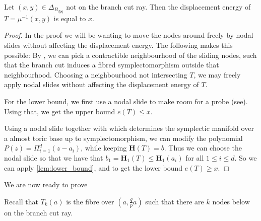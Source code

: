 \documentclass[12pt,a4paper,draft]{scrartcl}
\begin{document}

\begin{lemma}
  \label{lem:bdq_displacement}
  Let $(x,y) ∈ Δ_{B_{dpq}}$ not on the branch cut ray. Then the displacement energy of $T = μ^{-1}(x,y)$ is equal to $x$.
\end{lemma}

\begin{proof}
  In the proof we will be wanting to move the nodes around freely by nodal slides without affecting the displacement energy. The following makes this possible:
  By \cite[Theorem 8.9]{evans2021atfs}, we can pick a contractible neighbourhood of the sliding nodes, such that the branch cut induces a fibred symplectomorphism outside that neighbourhood. Choosing a neighbourhood not intersecting $T$, we may freely apply nodal slides without affecting the displacement energy of $T$.

  For the lower bound, we first use a nodal slide to make room for a probe (see). Using that, we get the upper bound $e(T)≤x$.
  
  Using a nodal slide together with \cite[Corollary 5.4]{symington2002FourDF} which determines the symplectic manifold over a almost toric base up to symplectomorphism, we can modify the polynomial $P(z) = Π_{i=1}^d (z-a_i)$, while keeping $\symbf{H}(T) = {b}$.
  Thus we can choose the nodal slide so that we have that $b_1 = \symbf{H}_1(T) ≤ \symbf{H}_1(a_i)$ for all $ 1 ≤ i ≤ d$.
  So we can apply \cref{lem:lower_bound}, and to get the lower bound $e(T) ≥ x$.
\end{proof}

We are now ready to prove

\thmbdpqexotic*

Recall that $T_k(a)$ is the fibre over $(a,\frac{q}{p}a)$ such that there are $k$ nodes below on the branch cut ray.
\end{document}
